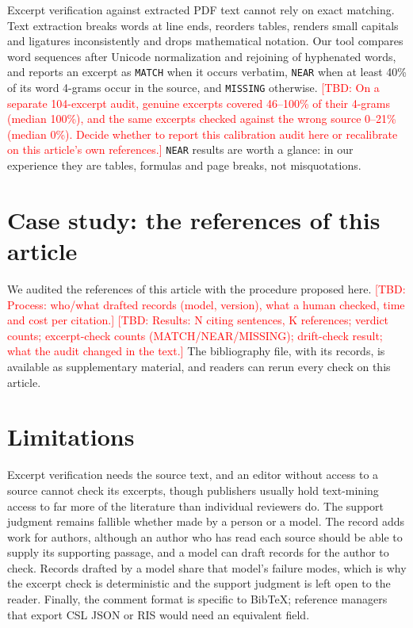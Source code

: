 \documentclass[11pt]{article}
\newcommand{\TBD}[1]{\textcolor{red}{[TBD: #1]}}
\begin{document}
Excerpt verification against extracted PDF text cannot rely on exact matching. Text extraction breaks words at line ends, reorders tables, renders small capitals and ligatures inconsistently and drops mathematical notation. Our tool compares word sequences after Unicode normalization and rejoining of hyphenated words, and reports an excerpt as \texttt{MATCH} when it occurs verbatim, \texttt{NEAR} when at least 40\% of its word 4-grams occur in the source, and \texttt{MISSING} otherwise. \TBD{On a separate 104-excerpt audit, genuine excerpts covered 46--100\% of their 4-grams (median 100\%), and the same excerpts checked against the wrong source 0--21\% (median 0\%). Decide whether to report this calibration audit here or recalibrate on this article's own references.} \texttt{NEAR} results are worth a glance: in our experience they are tables, formulas and page breaks, not misquotations.

\section{Case study: the references of this article}

We audited the references of this article with the procedure proposed here. \TBD{Process: who/what drafted records (model, version), what a human checked, time and cost per citation.} \TBD{Results: N citing sentences, K references; verdict counts; excerpt-check counts (MATCH/NEAR/MISSING); drift-check result; what the audit changed in the text.} The bibliography file, with its records, is available as supplementary material, and readers can rerun every check on this article.

\section{Limitations}

Excerpt verification needs the source text, and an editor without access to a source cannot check its excerpts, though publishers usually hold text-mining access to far more of the literature than individual reviewers do. The support judgment remains fallible whether made by a person or a model. The record adds work for authors, although an author who has read each source should be able to supply its supporting passage, and a model can draft records for the author to check. Records drafted by a model share that model's failure modes, which is why the excerpt check is deterministic and the support judgment is left open to the reader. Finally, the comment format is specific to BibTeX; reference managers that export CSL JSON or RIS would need an equivalent field.
\end{document}
